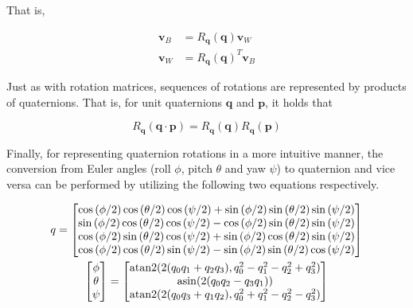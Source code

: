 \noindent That is,

\begin{align}
	\mathbf{v}_B &= R_{\mathbf{q}}(\mathbf{q})\mathbf{v}_W \\
	\mathbf{v}_W &= R_{\mathbf{q}}(\mathbf{q})^T\mathbf{v}_B
	\label{eq:quatRotationMatrix3}
\end{align}

\noindent Just as with rotation matrices, sequences of rotations are represented by products of quaternions. That is, for unit quaternions $\mathbf{q}$ and $\mathbf{p}$, it holds that

\begin{equation}
	R_{\mathbf{q}}(\mathbf{q} \cdot \mathbf{p}) = R_{\mathbf{q}}(\mathbf{q})R_{\mathbf{q}}(\mathbf{p})
	\label{eq:quatRotationMatrix4}
\end{equation}

\noindent Finally, for representing quaternion rotations in a more intuitive manner, the conversion from Euler angles (roll $\phi$, pitch $\theta$ and yaw $\psi$) to quaternion and vice versa can be performed by utilizing the following two equations respectively.

\begin{gather}
	q = 
	\begin{bmatrix}
		\cos{(\phi/2)}\cos{(\theta/2)}\cos{(\psi/2)} + \sin{(\phi/2)}\sin{(\theta/2)}\sin{(\psi/2)} \\
		\sin{(\phi/2)}\cos{(\theta/2)}\cos{(\psi/2)} - \cos{(\phi/2)}\sin{(\theta/2)}\sin{(\psi/2)} \\
		\cos{(\phi/2)}\sin{(\theta/2)}\cos{(\psi/2)} + \sin{(\phi/2)}\cos{(\theta/2)}\sin{(\psi/2)} \\
		\cos{(\phi/2)}\cos{(\theta/2)}\sin{(\psi/2)} - \sin{(\phi/2)}\sin{(\theta/2)}\cos{(\psi/2)} 
	\end{bmatrix} \\
	\begin{bmatrix}
		\phi \\
		\theta \\
		\psi
	\end{bmatrix}
	=
	\begin{bmatrix}
		\atan2(2(q_0q_1+q_2q_3), q_0^2-q_1^2-q_2^2+q_3^2) \\
		\asin(2(q_0q_2-q_3q_1)) \\
		\atan2(2(q_0q_3+q_1q_2), q_0^2+q_1^2-q_2^2-q_3^2)
	\end{bmatrix}
	\label{eq:quatEuler}
\end{gather}

